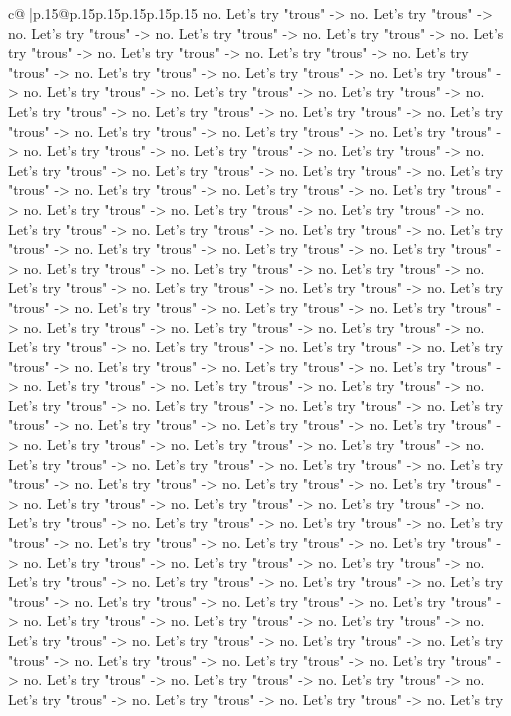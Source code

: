 \documentclass{article}
\begin{document}
{\begin{supertabular}{c@{$\;$}|p{.15\linewidth}@{}p{.15\linewidth}p{.15\linewidth}p{.15\linewidth}p{.15\linewidth}p{.15\linewidth}}
{{{no. Let's try "trous" {-}> no. Let's try "trous" {-}> no. Let's try "trous" {-}> no. Let's try "trous" {-}> no. Let's try "trous" {-}> no. Let's try "trous" {-}> no. Let's try "trous" {-}> no. Let's try "trous" {-}> no. Let's try "trous" {-}> no. Let's try "trous" {-}> no. Let's try "trous" {-}> no. Let's try "trous" {-}> no. Let's try "trous" {-}> no. Let's try "trous" {-}> no. Let's try "trous" {-}> no. Let's try "trous" {-}> no. Let's try "trous" {-}> no. Let's try "trous" {-}> no. Let's try "trous" {-}> no. Let's try "trous" {-}> no. Let's try "trous" {-}> no. Let's try "trous" {-}> no. Let's try "trous" {-}> no. Let's try "trous" {-}> no. Let's try "trous" {-}> no. Let's try "trous" {-}> no. Let's try "trous" {-}> no. Let's try "trous" {-}> no. Let's try "trous" {-}> no. Let's try "trous" {-}> no. Let's try "trous" {-}> no. Let's try "trous" {-}> no. Let's try "trous" {-}> no. Let's try "trous" {-}> no. Let's try "trous" {-}> no. Let's try "trous" {-}> no. Let's try "trous" {-}> no. Let's try "trous" {-}> no. Let's try "trous" {-}> no. Let's try "trous" {-}> no. Let's try "trous" {-}> no. Let's try "trous" {-}> no. Let's try "trous" {-}> no. Let's try "trous" {-}> no. Let's try "trous" {-}> no. Let's try "trous" {-}> no. Let's try "trous" {-}> no. Let's try "trous" {-}> no. Let's try "trous" {-}> no. Let's try "trous" {-}> no. Let's try "trous" {-}> no. Let's try "trous" {-}> no. Let's try "trous" {-}> no. Let's try "trous" {-}> no. Let's try "trous" {-}> no. Let's try "trous" {-}> no. Let's try "trous" {-}> no. Let's try "trous" {-}> no. Let's try "trous" {-}> no. Let's try "trous" {-}> no. Let's try "trous" {-}> no. Let's try "trous" {-}> no. Let's try "trous" {-}> no. Let's try "trous" {-}> no. Let's try "trous" {-}> no. Let's try "trous" {-}> no. Let's try "trous" {-}> no. Let's try "trous" {-}> no. Let's try "trous" {-}> no. Let's try "trous" {-}> no. Let's try "trous" {-}> no. Let's try "trous" {-}> no. Let's try "trous" {-}> no. Let's try "trous" {-}> no. Let's try "trous" {-}> no. Let's try "trous" {-}> no. Let's try "trous" {-}> no. Let's try "trous" {-}> no. Let's try "trous" {-}> no. Let's try "trous" {-}> no. Let's try "trous" {-}> no. Let's try "trous" {-}> no. Let's try "trous" {-}> no. Let's try "trous" {-}> no. Let's try "trous" {-}> no. Let's try "trous" {-}> no. Let's try "trous" {-}> no. Let's try "trous" {-}> no. Let's try "trous" {-}> no. Let's try "trous" {-}> no. Let's try "trous" {-}> no. Let's try "trous" {-}> no. Let's try "trous" {-}> no. Let's try "trous" {-}> no. Let's try "trous" {-}> no. Let's try "trous" {-}> no. Let's try "trous" {-}> no. Let's try "trous" {-}> no. Let's try "trous" {-}> no. Let's try "trous" {-}> no. Let's try "trous" {-}> no. Let's try "trous" {-}> no. Let's try "trous" {-}> no. Let's try "trous" {-}> no. Let's try "trous" {-}> no. Let's try "trous" {-}> no. Let's try "trous" {-}> no. Let's try "trous" {-}> no. Let's try "trous" {-}> no. Let's try "trous" {-}> no. Let's try "trous" {-}> no. Let's try "trous" {-}> no. Let's try "trous" {-}> no. Let's try "trous" {-}> no. Let's try "trous" {-}> no. Let's try "trous" {-}> no. Let's try "trous" {-}> no. Let's try "trous" {-}> no. Let's try }}}
\end{supertabular}}
\end{document}
